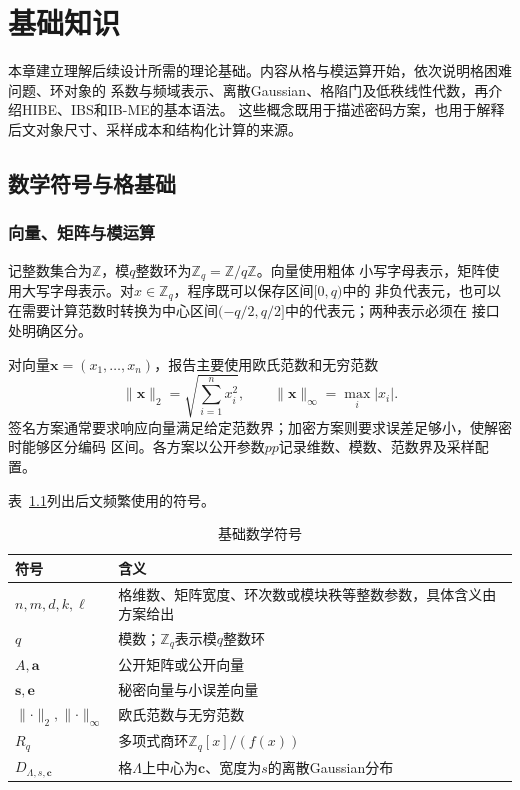 \chapter{基础知识}

本章建立理解后续设计所需的理论基础。内容从格与模运算开始，依次说明格困难问题、环对象的
系数与频域表示、离散Gaussian、格陷门及低秩线性代数，再介绍HIBE、IBS和IB-ME的基本语法。
这些概念既用于描述密码方案，也用于解释后文对象尺寸、采样成本和结构化计算的来源。

\section{数学符号与格基础}

\subsection{向量、矩阵与模运算}

记整数集合为$\mathbb Z$，模$q$整数环为$\mathbb Z_q=\mathbb Z/q\mathbb Z$。向量使用粗体
小写字母表示，矩阵使用大写字母表示。对$x\in\mathbb Z_q$，程序既可以保存区间$[0,q)$中的
非负代表元，也可以在需要计算范数时转换为中心区间$(-q/2,q/2]$中的代表元；两种表示必须在
接口处明确区分。

对向量$\mathbf x=(x_1,\ldots,x_n)$，报告主要使用欧氏范数和无穷范数
\[
 \lVert\mathbf x\rVert_2=\sqrt{\sum_{i=1}^{n}x_i^2},
 \qquad
 \lVert\mathbf x\rVert_\infty=\max_i|x_i|.
\]
签名方案通常要求响应向量满足给定范数界；加密方案则要求误差足够小，使解密时能够区分编码
区间。各方案以公开参数$pp$记录维数、模数、范数界及采样配置。

表~\ref{tab:foundation-symbols}列出后文频繁使用的符号。

\begin{table}[H]
\centering\small
\caption{基础数学符号}
\label{tab:foundation-symbols}
\begin{tabularx}{\textwidth}{@{}p{}X@{}}
\toprule
\rowcolor{black!8} 符号 & 含义 \\
\midrule
$n,m,d,k,\ell$ & 格维数、矩阵宽度、环次数或模块秩等整数参数，具体含义由方案给出 \\
$q$ & 模数；$\mathbb Z_q$表示模$q$整数环 \\
$A,\mathbf a$ & 公开矩阵或公开向量 \\
$\mathbf s,\mathbf e$ & 秘密向量与小误差向量 \\
$\lVert\cdot\rVert_2,\lVert\cdot\rVert_\infty$ & 欧氏范数与无穷范数 \\
$R_q$ & 多项式商环$\mathbb Z_q[x]/(f(x))$ \\
$D_{\Lambda,s,\mathbf c}$ & 格$\Lambda$上中心为$\mathbf c$、宽度为$s$的离散Gaussian分布 \\
\bottomrule
\end{tabularx}
\end{table}

